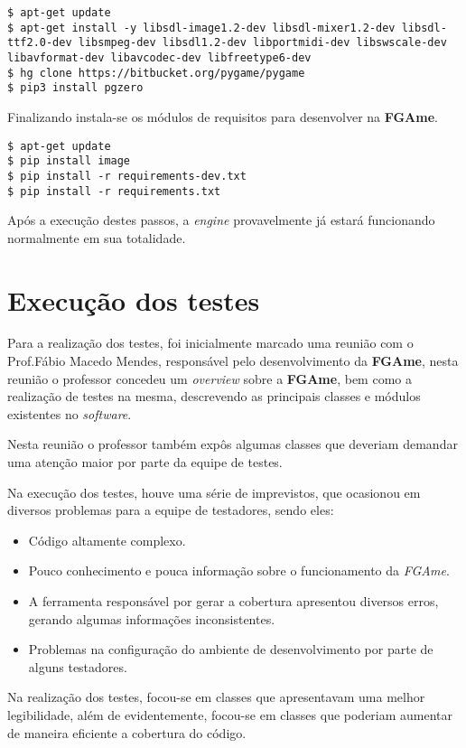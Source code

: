 \begin{lstlisting}
$ apt-get update
$ apt-get install -y libsdl-image1.2-dev libsdl-mixer1.2-dev libsdl-ttf2.0-dev libsmpeg-dev libsdl1.2-dev libportmidi-dev libswscale-dev libavformat-dev libavcodec-dev libfreetype6-dev
$ hg clone https://bitbucket.org/pygame/pygame
$ pip3 install pgzero
\end{lstlisting}

Finalizando instala-se os módulos de requisitos para desenvolver na \textbf{FGAme}.

\begin{lstlisting}
$ apt-get update
$ pip install image
$ pip install -r requirements-dev.txt
$ pip install -r requirements.txt
\end{lstlisting}

Após a execução destes passos, a \textit{engine} provavelmente já estará funcionando normalmente em sua totalidade.

\section{Execução dos testes}

Para a realização dos testes, foi inicialmente marcado uma reunião com o Prof.Fábio Macedo Mendes, responsável pelo desenvolvimento da \textbf{FGAme}, nesta reunião o professor concedeu um \textit{overview} sobre a \textbf{FGAme}, bem como a realização de testes na mesma, descrevendo as principais classes e módulos existentes no \textit{software}.

Nesta reunião o professor também expôs algumas classes que deveriam demandar uma atenção maior por parte da equipe de testes.

Na execução dos testes, houve uma série de imprevistos, que ocasionou em diversos problemas para a equipe de testadores, sendo eles:

\begin{itemize}
\item Código altamente complexo.
\item Pouco conhecimento e pouca informação sobre o funcionamento da \textit{FGAme}.
\item A ferramenta responsável por gerar a cobertura apresentou diversos erros, gerando algumas informações inconsistentes.
\item Problemas na configuração do ambiente de desenvolvimento por parte de alguns testadores.
\end{itemize}

Na realização dos testes, focou-se em classes que apresentavam uma melhor legibilidade, além de evidentemente, focou-se em classes que poderiam aumentar de maneira eficiente a cobertura do código.

